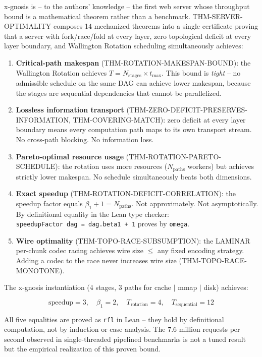 \documentclass[
  11pt,
]{article}
\begin{document}
x-gnosis is -- to the authors' knowledge -- the first web server whose
throughput bound is a mathematical theorem rather than a benchmark.
THM-SERVER-OPTIMALITY composes 14 mechanized theorems into a single
certificate proving that a server with fork/race/fold at every layer,
zero topological deficit at every layer boundary, and Wallington
Rotation scheduling simultaneously achieves:

\begin{enumerate}
\def\labelenumi{\arabic{enumi}.}
\item
  \textbf{Critical-path makespan} (THM-ROTATION-MAKESPAN-BOUND): the
  Wallington Rotation achieves
  \(T = N_{\text{stages}} \times t_{\text{max}}\). This bound is
  \emph{tight} -- no admissible schedule on the same DAG can achieve
  lower makespan, because the stages are sequential dependencies that
  cannot be parallelized.
\item
  \textbf{Lossless information transport}
  (THM-ZERO-DEFICIT-PRESERVES-INFORMATION, THM-COVERING-MATCH): zero
  deficit at every layer boundary means every computation path maps to
  its own transport stream. No cross-path blocking. No information loss.
\item
  \textbf{Pareto-optimal resource usage} (THM-ROTATION-PARETO-SCHEDULE):
  the rotation uses more resources (\(N_{\text{paths}}\) workers) but
  achieves strictly lower makespan. No schedule simultaneously beats
  both dimensions.
\item
  \textbf{Exact speedup} (THM-ROTATION-DEFICIT-CORRELATION): the speedup
  factor equals \(\beta_1 + 1 = N_{\text{paths}}\). Not approximately.
  Not asymptotically. By definitional equality in the Lean type checker:
  \texttt{speedupFactor\ dag\ =\ dag.beta1\ +\ 1} proves by
  \texttt{omega}.
\item
  \textbf{Wire optimality} (THM-TOPO-RACE-SUBSUMPTION): the LAMINAR
  per-chunk codec racing achieves wire size \(\leq\) any fixed encoding
  strategy. Adding a codec to the race never increases wire size
  (THM-TOPO-RACE-MONOTONE).
\end{enumerate}

The x-gnosis instantiation (4 stages, 3 paths for cache \(\mid\) mmap
\(\mid\) disk) achieves:

\[
\text{speedup} = 3, \quad \beta_1 = 2, \quad T_{\text{rotation}} = 4, \quad T_{\text{sequential}} = 12
\]

All five equalities are proved as \texttt{rfl} in Lean -- they hold by
definitional computation, not by induction or case analysis. The 7.6
million requests per second observed in single-threaded pipelined
benchmarks is not a tuned result but the empirical realization of this
proven bound.
\end{document}
